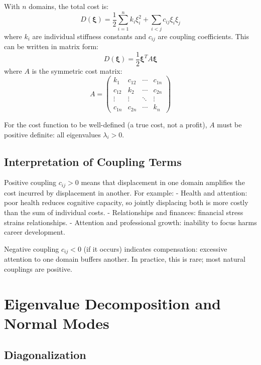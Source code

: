 \documentclass[12pt]{article}
\begin{document}
With $n$ domains, the total cost is:
\begin{equation}
D(\boldsymbol{\xi}) = \frac{1}{2} \sum_{i=1}^n k_i \xi_i^2 + \sum_{i < j} c_{ij} \xi_i \xi_j
\end{equation}
where $k_i$ are individual stiffness constants and $c_{ij}$ are coupling coefficients. This can be written in matrix form:
\begin{equation}
D(\boldsymbol{\xi}) = \frac{1}{2} \boldsymbol{\xi}^T A \boldsymbol{\xi}
\end{equation}
where $A$ is the symmetric cost matrix:
\begin{equation}
A = \begin{pmatrix}
k_1 & c_{12} & \cdots & c_{1n} \\
c_{12} & k_2 & \cdots & c_{2n} \\
\vdots & \vdots & \ddots & \vdots \\
c_{1n} & c_{2n} & \cdots & k_n
\end{pmatrix}
\end{equation}

For the cost function to be well-defined (a true cost, not a profit), $A$ must be positive definite: all eigenvalues $\lambda_i > 0$.

\subsection{Interpretation of Coupling Terms}

Positive coupling $c_{ij} > 0$ means that displacement in one domain amplifies the cost incurred by displacement in another. For example:
- Health and attention: poor health reduces cognitive capacity, so jointly displacing both is more costly than the sum of individual costs.
- Relationships and finances: financial stress strains relationships.
- Attention and professional growth: inability to focus harms career development.

Negative coupling $c_{ij} < 0$ (if it occurs) indicates compensation: excessive attention to one domain buffers another. In practice, this is rare; most natural couplings are positive.

\section{Eigenvalue Decomposition and Normal Modes}

\subsection{Diagonalization}
\end{document}
